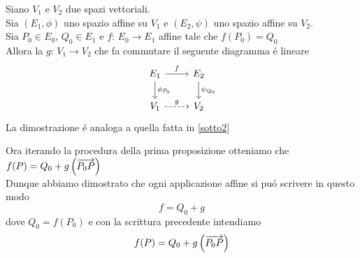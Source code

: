 \begin{prop}Siano $V_1$ e $V_2 $ due spazi vettoriali.\\
Sia $(E_1, \phi) $ uno spazio affine su $V_1 $ e $(E_2, \psi)$ uno spazio affine su $V_2$.\\
Sia  $P_0 \in E_0 $, $Q_0 \in E_1$ e $f:\, E_0 \to E_1 $ affine tale che $f(P_0) = Q_0$\\
Allora la $g:\, V_1 \to V_2 $ che fa commutare il seguente diagramma \'e lineare 
$$ \begin{tikzcd} 
E_1 \arrow[r,"f"]
	  \arrow{d}{\phi_{P_0}} &E_2 \arrow{d}{\psi_{Q_0}} \\ V_1 \arrow[r,dashed,"g"] & V_2 
\end{tikzcd}$$
\proof La dimostrazione \'e analoga a quella fatta in  \ref{sotto2}
\end{prop}
Ora iterando la procedura della prima proposizione otteniamo che 
$f(P)= Q_0+ g \left( \overrightarrow{P_0 P }  \right)$\\ 
Dunque abbiamo dimostrato che ogni applicazione affine si pu\'o scrivere  in questo modo
$$ f= Q_0 + g  $$
dove  $Q_0= f(P_0)$ e con la scrittura precedente intendiamo 
$$ f(P) = Q_0 + g \left( \overrightarrow{P_0 P } \right) $$
\spazio

